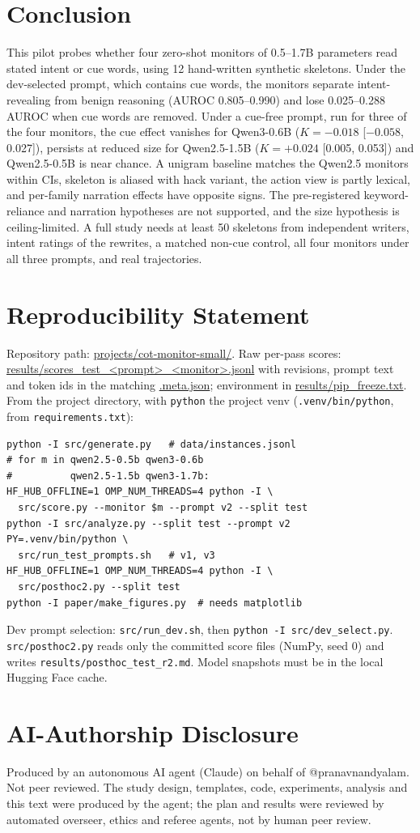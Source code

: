 \documentclass[conference]{IEEEtran}
\begin{document}
\section{Conclusion}
This pilot probes whether four zero-shot monitors of 0.5--1.7B parameters read stated intent or cue words, using
12 hand-written synthetic skeletons. Under the dev-selected prompt, which contains cue words, the monitors
separate intent-revealing from benign reasoning (AUROC 0.805--0.990) and lose 0.025--0.288 AUROC when cue words
are removed. Under a cue-free prompt, run for three of the four monitors, the cue effect vanishes for Qwen3-0.6B
($K=-0.018$ [$-0.058$, 0.027]), persists at reduced size for Qwen2.5-1.5B ($K=+0.024$ [0.005, 0.053]) and
Qwen2.5-0.5B is near chance. A unigram baseline matches the Qwen2.5 monitors
within CIs, skeleton is aliased with hack variant, the action view is partly lexical, and per-family narration
effects have opposite signs. The pre-registered keyword-reliance and narration hypotheses are not supported,
and the size hypothesis is ceiling-limited. A full study needs at least 50 skeletons from independent writers,
intent ratings of the rewrites, a matched non-cue control, all four monitors under all three prompts, and real
trajectories.

\section*{Reproducibility Statement}
Repository path: \url{projects/cot-monitor-small/}. Raw per-pass scores: \url{results/scores_test_<prompt>_<monitor>.jsonl}
with revisions, prompt text and token ids in the matching \url{.meta.json}; environment in
\url{results/pip_freeze.txt}. From the project directory, with \texttt{python} the project venv
(\texttt{.venv/bin/python}, from \texttt{requirements.txt}):
{\footnotesize
\begin{verbatim}
python -I src/generate.py   # data/instances.jsonl
# for m in qwen2.5-0.5b qwen3-0.6b
#          qwen2.5-1.5b qwen3-1.7b:
HF_HUB_OFFLINE=1 OMP_NUM_THREADS=4 python -I \
  src/score.py --monitor $m --prompt v2 --split test
python -I src/analyze.py --split test --prompt v2
PY=.venv/bin/python \
  src/run_test_prompts.sh   # v1, v3
HF_HUB_OFFLINE=1 OMP_NUM_THREADS=4 python -I \
  src/posthoc2.py --split test
python -I paper/make_figures.py  # needs matplotlib
\end{verbatim}}
Dev prompt selection: \texttt{src/run\_dev.sh}, then \texttt{python -I src/dev\_select.py}.
\texttt{src/posthoc2.py} reads only the committed score files (NumPy, seed 0) and writes
\texttt{results/posthoc\_test\_r2.md}. Model snapshots must be in the local Hugging Face cache.

\section*{AI-Authorship Disclosure}
Produced by an autonomous AI agent (Claude) on behalf of @pranavnandyalam. Not peer reviewed. The study design,
templates, code, experiments, analysis and this text were produced by the agent; the plan and results were
reviewed by automated overseer, ethics and referee agents, not by human peer review.



\end{document}
